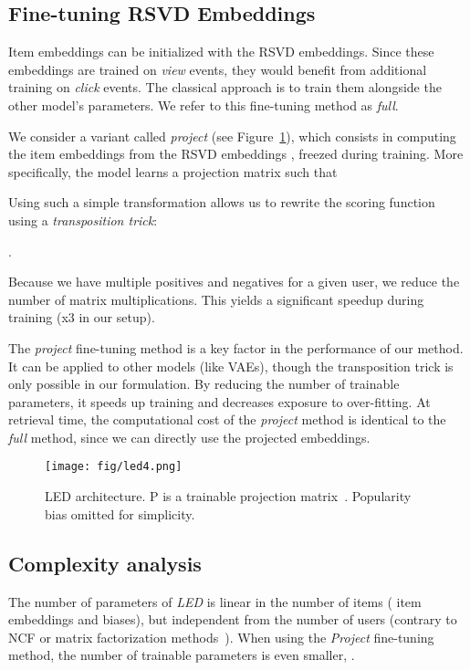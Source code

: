 \documentclass[sigconf]{acmart}
\begin{document}
\subsection{Fine-tuning RSVD Embeddings}
\label{subsec:fine-tuning-svd-embeddings}

Item embeddings can be initialized with the RSVD embeddings. Since these embeddings are trained on \emph{view} events, they would benefit from additional training on \emph{click} events. The classical approach is to train them alongside the other model's parameters. We refer to this fine-tuning method as \emph{full}. 

We consider a variant called \emph{project} (see Figure~\ref{fig:diagram-learning-led}), which consists in computing the item embeddings from the RSVD embeddings , freezed during training. More specifically, the model learns a projection matrix  such that


Using such a simple transformation allows us to rewrite the scoring function using a \emph{transposition trick}:



. 

Because we have multiple positives and negatives for a given user, we reduce the number of matrix multiplications. This yields a significant speedup during training (x3 in our setup).

The \emph{project} fine-tuning method is a key factor in the performance of our method. It can be applied to other models (like VAEs), though the transposition trick is only possible in our formulation. By reducing the number of trainable parameters, it speeds up training and decreases exposure to over-fitting. At retrieval time, the computational cost of the \emph{project} method is identical to the \emph{full} method, since we can directly use the projected embeddings.

\begin{figure}[t]
\centering
\texttt{[image: fig/led4.png]}
\caption{LED architecture. P is a trainable projection matrix~. Popularity bias omitted for simplicity.}
\label{fig:diagram-learning-led}
\end{figure}

\subsection{Complexity analysis}

The number of parameters of \emph{LED} is linear in the number of items ( item embeddings and  biases), but independent from the number of users  (contrary to NCF\cite{ncf-www-2017} or matrix factorization methods~\cite{wmf}). When using the \emph{Project} fine-tuning method, the number of trainable parameters is even smaller, .
\end{document}
